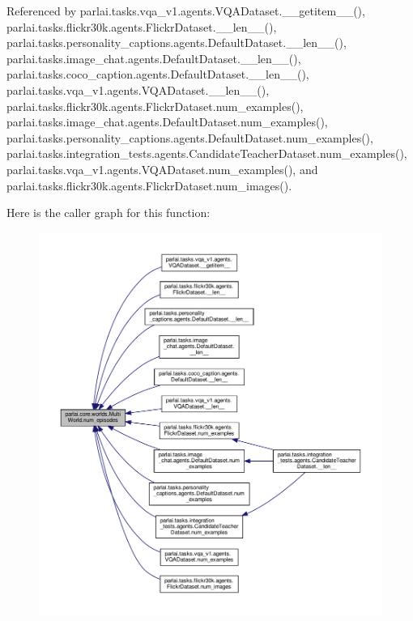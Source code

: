 Referenced by parlai.\+tasks.\+vqa\+\_\+v1.\+agents.\+V\+Q\+A\+Dataset.\+\_\+\+\_\+getitem\+\_\+\+\_\+(), parlai.\+tasks.\+flickr30k.\+agents.\+Flickr\+Dataset.\+\_\+\+\_\+len\+\_\+\+\_\+(), parlai.\+tasks.\+personality\+\_\+captions.\+agents.\+Default\+Dataset.\+\_\+\+\_\+len\+\_\+\+\_\+(), parlai.\+tasks.\+image\+\_\+chat.\+agents.\+Default\+Dataset.\+\_\+\+\_\+len\+\_\+\+\_\+(), parlai.\+tasks.\+coco\+\_\+caption.\+agents.\+Default\+Dataset.\+\_\+\+\_\+len\+\_\+\+\_\+(), parlai.\+tasks.\+vqa\+\_\+v1.\+agents.\+V\+Q\+A\+Dataset.\+\_\+\+\_\+len\+\_\+\+\_\+(), parlai.\+tasks.\+flickr30k.\+agents.\+Flickr\+Dataset.\+num\+\_\+examples(), parlai.\+tasks.\+image\+\_\+chat.\+agents.\+Default\+Dataset.\+num\+\_\+examples(), parlai.\+tasks.\+personality\+\_\+captions.\+agents.\+Default\+Dataset.\+num\+\_\+examples(), parlai.\+tasks.\+integration\+\_\+tests.\+agents.\+Candidate\+Teacher\+Dataset.\+num\+\_\+examples(), parlai.\+tasks.\+vqa\+\_\+v1.\+agents.\+V\+Q\+A\+Dataset.\+num\+\_\+examples(), and parlai.\+tasks.\+flickr30k.\+agents.\+Flickr\+Dataset.\+num\+\_\+images().

Here is the caller graph for this function\+:
\nopagebreak
\begin{figure}[H]
\begin{center}
\leavevmode
\includegraphics[width=350pt]{classparlai_1_1core_1_1worlds_1_1MultiWorld_a3efde7408bd94052b0a4880aefbc5d0a_icgraph}
\end{center}
\end{figure}
\mbox{\label{classparlai_1_1core_1_1worlds_1_1MultiWorld_ae62ad8500e4208ed99ffcf91707746e1}} 
